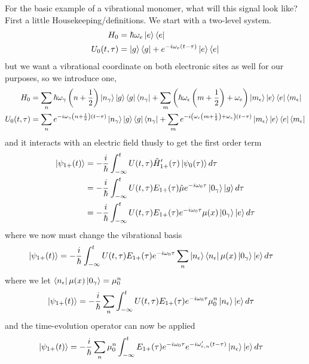 For the basic example of a vibrational monomer, what will this signal look like?  First a little Housekeeping/definitions.  We start with a two-level system.
\begin{align}
	H_0 &= \hbar \omega_e \ket{e}\bra{e} \\
	U_0(t, \tau) &= \ket{g}\bra{g} + e^{-i \omega_e \left( t - \tau \right) } \ket{e}\bra{e}
\end{align}
but we want a vibrational coordinate on both electronic sites as well for our purposes, so we introduce one,
\begin{align}
	H_0 &=  \sum_n \hbar \omega_{\gamma}  \left(n + \frac{1}{2} \right)  \ket{n_{\gamma}}\ket{g}\bra{g} \bra{n_{\gamma}} + \sum_m \left(  \hbar \omega_{\epsilon}  \left(m + \frac{1}{2} \right) + \omega_e \right)  \ket{m_{\epsilon}} \ket{e}\bra{e} \bra{m_{\epsilon}} \\
	U_0(t, \tau) &= \sum_n e^{-i \omega_{\gamma}  \left(n+ \frac{1}{2} \right) (t - \tau) } \ket{n_{\gamma}}\ket{g}\bra{g} \bra{n_{\gamma}} + \sum_m e^{- i \left( \omega_{\epsilon}\left(m  + \frac{1}{2}\right)  +  \omega_e \right) (t - \tau) } \ket{m_{\epsilon}} \ket{e}\bra{e} \bra{m_{\epsilon}}
\end{align}
and it interacts with an electric field thusly to get the first order term
\begin{align}
	\ket{\psi_{1+}(t)} &= -\frac{i}{\hbar} \int_{-\infty}^{t}U(t, \tau) \hat{H}'_{1+} (\tau) \ket{\psi_{0}(\tau)} d\tau\\
	 &= -\frac{i}{\hbar} \int_{-\infty}^{t}U(t, \tau) E_{1+} (\tau) \hat{\mu}  e^{-i \omega_0 \tau}\ket{0_{\gamma}}\ket{g}d\tau\\
	 &= -\frac{i}{\hbar} \int_{-\infty}^{t}U(t, \tau) E_{1+} (\tau)  e^{-i \omega_0 \tau}\mu(x)\ket{0_{\gamma}}\ket{e}d\tau
\end{align}
where we now must change the vibrational basis
\begin{align}
	\ket{\psi_{1+}(t)} &= -\frac{i}{\hbar} \int_{-\infty}^{t}U(t, \tau) E_{1+} (\tau) e^{-i \omega_0 \tau}\sum_{n}\ket{n_{\epsilon}}\bra{n_{\epsilon}}\mu(x)\ket{0_{\gamma}}\ket{e}d\tau
\end{align}
where we let $\bra{n_{\epsilon}}\mu(x)\ket{0_{\gamma}} = \mu_{0}^{n}$
\begin{align}
	\ket{\psi_{1+}(t)} &= -\frac{i}{\hbar} \sum_n \int_{-\infty}^{t}U(t, \tau) E_{1+} (\tau) e^{-i \omega_0 \tau}\mu_{0}^{n}\ket{n_{\epsilon}}\ket{e}d\tau
\end{align}
and the time-evolution operator can now be applied
\begin{align}
	\ket{\psi_{1+}(t)} &= -\frac{i}{\hbar} \sum_n \mu_{0}^{n} \int_{-\infty}^{t} E_{1+} (\tau) e^{-i \omega_0 \tau}e^{-i \omega'_{e, n} (t - \tau)} \ket{n_{\epsilon}}\ket{e}d\tau
\end{align}
